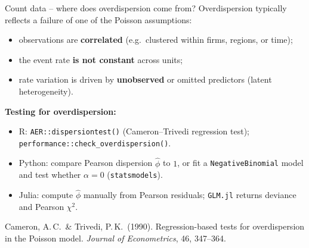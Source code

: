 \documentclass[10pt,ignorenonframetext,aspectratio=169]{beamer}
\begin{document}
\begin{frame}{Count data -- where does overdispersion come from?}
Overdispersion typically reflects a failure of one of the Poisson assumptions:

\begin{itemize}
\justifying
    \item observations are \textbf{correlated} (e.g.\ clustered within firms, regions, or time);
    \item the event rate \textbf{is not constant} across units;
    \item rate variation is driven by \textbf{unobserved} or omitted predictors (latent heterogeneity).
\end{itemize}

\medskip
\textbf{Testing for overdispersion:}
\begin{itemize}
    \item R: \texttt{AER::dispersiontest()} (Cameron--Trivedi regression test); \texttt{performance::check\_overdispersion()}.
    \item Python: compare Pearson dispersion $\hat{\phi}$ to $1$, or fit a \texttt{NegativeBinomial} model and test whether $\alpha = 0$ (\texttt{statsmodels}).
    \item Julia: compute $\hat{\phi}$ manually from Pearson residuals; \texttt{GLM.jl} returns deviance and Pearson $\chi^2$.
\end{itemize}

\medskip
{\scriptsize Cameron, A.\,C.\ \& Trivedi, P.\,K.\ (1990). Regression-based tests for overdispersion in the Poisson model. \textit{Journal of Econometrics}, 46, 347--364.}

\end{frame}
\end{document}

